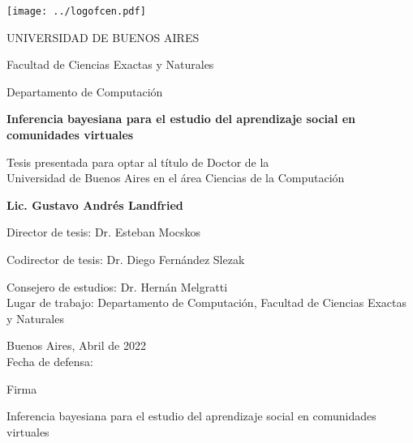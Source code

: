 \documentclass[a4paper,10pt]{book}
\author{Gustavo Landfried}
\makeatletter
\renewcommand{\frontmatter}{\cleardoublepage\@mainmatterfalse}
\theoremstyle{definition}
\newcommand{\TITULO}[0]{Inferencia bayesiana para el estudio del aprendizaje social en comunidades virtuales}
\makeatother
\begin{document}
\frontmatter
{}

\begin{center}

\texttt{[image: ../logofcen.pdf]}

\medskip
UNIVERSIDAD DE BUENOS AIRES

Facultad de Ciencias Exactas y Naturales

Departamento de Computaci\'on


\vspace{3cm}

\textbf{\LARGE \TITULO}

\vspace{1cm}



Tesis presentada para optar al t\'itulo de Doctor de la \\
Universidad de Buenos Aires en el \'area Ciencias de la Computaci\'on

\vspace{3cm}

\textbf{Lic. Gustavo Andrés Landfried}

\end{center}

\vspace{2.5cm}

\noindent Director de tesis: Dr. Esteban Mocskos 

\noindent Codirector de tesis: Dr. Diego Fernández Slezak

\noindent Consejero de estudios: Dr. Hernán Melgratti \\

\noindent Lugar de trabajo: Departamento de Computación, Facultad de Ciencias Exactas y Naturales

\vspace{0.5cm}

\noindent Buenos Aires, Abril de 2022\\

\noindent Fecha de defensa: \\%

\vspace{0.5cm}

\hspace*{0pt}\hfill Firma \hspace{2cm}

\newpage

\begin{center}
\Large \TITULO \normalsize
\end{center}
\end{document}
